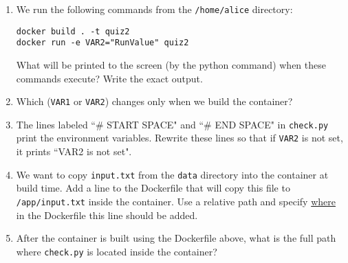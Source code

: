 \documentclass[11pt]{article}
\begin{document}
\begin{enumerate}

\item We run the following commands from the \texttt{/home/alice} directory:
\begin{verbatim}
docker build . -t quiz2
docker run -e VAR2="RunValue" quiz2
\end{verbatim}

What will be printed to the screen (by the python command) when these commands execute? Write the exact output.

\vspace{3cm}

\item Which (\texttt{VAR1} or \texttt{VAR2}) changes only when we build the container? 
\vspace{3cm}

\item The lines labeled ``\# START SPACE" and ``\# END SPACE" in \texttt{check.py} print the environment variables. Rewrite these lines so that if \texttt{VAR2} is not set, it prints ``VAR2 is not set".

\vspace{5cm}

\item We want to copy \texttt{input.txt} from the \texttt{data} directory into the container at build time. Add a line to the Dockerfile that will copy this file to \texttt{/app/input.txt} inside the container. Use a relative path and specify \underline{where} in the Dockerfile this line should be added.

\vspace{4cm}

\item After the container is built using the Dockerfile above, what is the full path where \texttt{check.py} is located inside the container? 

\end{enumerate}
\end{document}
